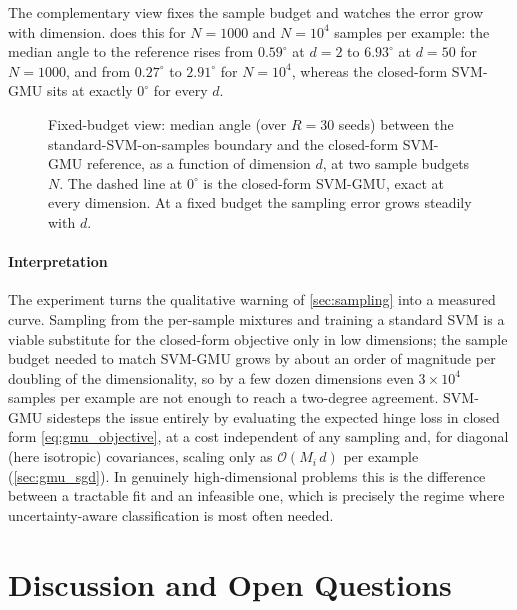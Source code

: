 \documentclass[11pt, letterpaper]{article}
\begin{document}
The complementary view fixes the sample budget and watches the error grow with dimension.  does this for $N = 1000$ and $N = 10^4$ samples per example: the median angle to the reference rises from $0.59^\circ$ at $d = 2$ to $6.93^\circ$ at $d = 50$ for $N = 1000$, and from $0.27^\circ$ to $2.91^\circ$ for $N = 10^4$, whereas the closed-form SVM-GMU sits at exactly $0^\circ$ for every $d$.

\begin{figure}[H]
    \centering
    \resizebox{0.75\textwidth}{!}{}
    \caption{Fixed-budget view: median angle (over $R = 30$ seeds) between the standard-SVM-on-samples boundary and the closed-form SVM-GMU reference, as a function of dimension $d$, at two sample budgets $N$. The dashed line at $0^\circ$ is the closed-form SVM-GMU, exact at every dimension. At a fixed budget the sampling error grows steadily with $d$.}
    \label{fig:exp_high_dim_budget}
\end{figure}

\subsection{Interpretation}

The experiment turns the qualitative warning of \cref{sec:sampling} into a measured curve. Sampling from the per-sample mixtures and training a standard SVM is a viable substitute for the closed-form objective only in low dimensions; the sample budget needed to match SVM-GMU grows by about an order of magnitude per doubling of the dimensionality, so by a few dozen dimensions even $3\times10^4$ samples per example are not enough to reach a two-degree agreement. SVM-GMU sidesteps the issue entirely by evaluating the expected hinge loss in closed form \cref{eq:gmu_objective}, at a cost independent of any sampling and, for diagonal (here isotropic) covariances, scaling only as $\mathcal{O}(M_i\, d)$ per example (\cref{sec:gmu_sgd}). In genuinely high-dimensional problems this is the difference between a tractable fit and an infeasible one, which is precisely the regime where uncertainty-aware classification is most often needed.

\part{Discussion and Open Questions}\label{part:discussion}
\end{document}
